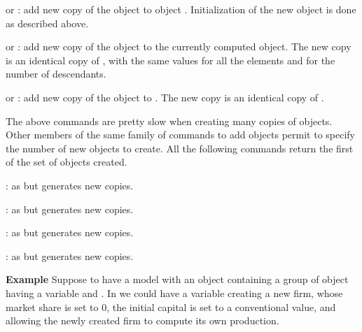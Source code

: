 \documentclass [11pt,a4paper] {book}
\begin{document}
\begin{list}{-}{\itemsep -0.2cm}
\item {} or : add new copy of the object  to object . Initialization of the new object is done as described above.

\item {} or : add new copy of the object  to the currently computed object. The new copy is an identical copy of , with the same values for all the elements and for the number of descendants.

\item {} or : add new copy of the object  to . The new copy is an identical copy of .

\end{list}

The above commands are pretty slow when creating many copies of objects. Other members of the same family of commands to add objects permit to specify the number of new objects to create. All the following commands return the first of the set of objects created.

\begin{list}{-}{\itemsep -0.2cm}

\item {}: as  but generates  new copies.


\item {}: as  but generates  new copies.

\item {}: as  but generates  new copies.

\item {}: as  but generates  new copies.

\end{list}


\textbf{Example} Suppose to have a model with an object  containing a group of object  having a variable   and . In  we could have a variable  creating a new firm, whose market share is set to 0, the initial capital is set to a conventional value,
and allowing the newly created firm to compute its own production.
\end{document}
